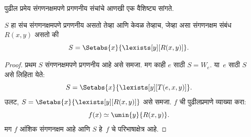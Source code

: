 \documentclass[../../../include/open-logic-section]{subfiles}
\begin{document}
पुढील प्रमेय संगणनक्षमपणे प्रगणनीय संचांचे आणखी एक वैशिष्ट्य
सांगते.

\begin{thm}
$S$ हा संच संगणनक्षमपणे प्रगणनीय असतो तेव्हा आणि केवळ तेव्हाच, जेव्हा
असा संगणनक्षम संबंध $R(x,y)$ असतो की
\[
S = \Setabs{ x }{ \lexists[y][R(x,y)] }.
\]
\end{thm}

\begin{proof}
प्रथम $S$ संगणनक्षमपणे प्रगणनीय आहे असे समजा. मग काही
$e$ साठी $S = W_e$. या~$e$ साठी $S$ असे लिहिता येते:
\[
S = \Setabs{ x }{ \lexists[y][T(e, x, y)] }.
\]
उलट, $S = \Setabs{ x }{
  \lexists[y][R(x, y)] }$ असे समजा. $f$ ची पुढीलप्रमाणे व्याख्या करा:
\[
f(x) \simeq \umin{y}{R(x, y)}.
\]
मग $f$ आंशिक संगणनक्षम आहे आणि $S$ हे~$f$ चे परिभाषाक्षेत्र आहे.
\end{proof}
\end{document}
